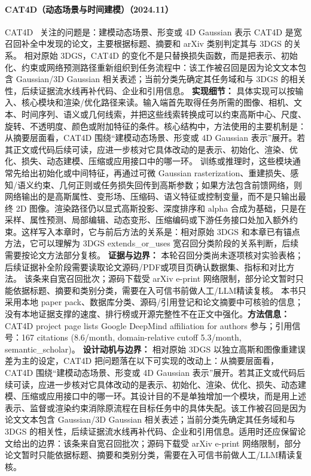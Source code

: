\paragraph{CAT4D（动态场景与时间建模）（2024.11）}
CAT4D~\cite{2411_18613} 关注的问题是：建模动态场景、形变或 4D Gaussian 表示 CAT4D 是宽召回补全中发现的论文，主要根据标题、摘要和 arXiv 类别判定其与 3DGS 的关系。
相对原始 3DGS，CAT4D 的变化不是只替换损失函数，而是把表示、初始化、约束或网络预测路径重新组织到任务流程中：该工作被召回是因为论文文本包含 Gaussian/3D Gaussian 相关表述；当前分类先确定其任务域和与 3DGS 的相关性，后续证据流水线再补代码、企业和引用信息。
\textbf{实现细节：} 具体实现可以按输入、核心模块和渲染/优化路径来读。输入端首先取得任务所需的图像、相机、文本、时间序列、语义或几何线索，并把这些线索转换成可以约束高斯中心、尺度、旋转、不透明度、颜色或附加特征的条件。核心结构中，方法使用的主要机制是：从摘要层面看，CAT4D 围绕“建模动态场景、形变或 4D Gaussian 表示”展开。若其正文或代码后续可读，应进一步核对它具体改动的是表示、初始化、渲染、优化、损失、动态建模、压缩或应用接口中的哪一环。 训练或推理时，这些模块通常先给出初始化或中间特征，再通过可微 Gaussian rasterization、重建损失、感知/语义约束、几何正则或任务损失回传到高斯参数；如果方法包含前馈网络，则网络输出的是高斯属性、变形场、压缩码、语义特征或控制变量，而不是只输出最终 2D 图像。渲染路径仍以显式高斯投影、深度排序和 alpha 合成为基础，只是在采样、属性预测、局部编辑、动态变形、压缩编码或下游任务接口处加入额外约束。这样写入本章时，它与前后方法的关系是：相对原始 3DGS 和本章已有锚点方法，它可以理解为 3DGS extends\_or\_uses 宽召回分类阶段的关系判断，后续需要按论文方法部分复核。
\textbf{证据与边界：} 本轮召回分类尚未逐项核对实验表格；后续证据补全阶段需要读取论文源码/PDF或项目页确认数据集、指标和对比方法。 该条来自宽召回批次；源码下载受 arXiv e-print 网络限制，部分论文暂时只能依据标题、摘要和类别分类，需要在入可信书前做人工/LLM精读复核。 本书只采用本地 paper pack、数据库分类、源码/引用登记和论文摘要中可核验的信息；没有本地证据支撑的速度、排行榜或开源完整性不在正文中强化。\textbf{方法信息：} CAT4D project page lists Google DeepMind affiliation for authors 参与；引用信号：167 citations (8.6/month, domain-relative cutoff 5.3/month, semantic\_scholar)。
\textbf{设计动机与边界：} 相对原始 3DGS 以独立高斯和图像重建误差为主的设定，CAT4D 把问题落在以下可实现的改动上：从摘要层面看，CAT4D 围绕“建模动态场景、形变或 4D Gaussian 表示”展开。若其正文或代码后续可读，应进一步核对它具体改动的是表示、初始化、渲染、优化、损失、动态建模、压缩或应用接口中的哪一环。其设计目的不是单独增加一个模块，而是用上述表示、监督或渲染约束消除原流程在目标任务中的具体失配。该工作被召回是因为论文文本包含 Gaussian/3D Gaussian 相关表述；当前分类先确定其任务域和与 3DGS 的相关性，后续证据流水线再补代码、企业和引用信息。适用时还应保留论文给出的边界：该条来自宽召回批次；源码下载受 arXiv e-print 网络限制，部分论文暂时只能依据标题、摘要和类别分类，需要在入可信书前做人工/LLM精读复核。
